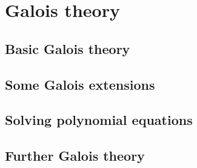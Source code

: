 \part{Galois theory}

\chapter{Basic Galois theory}
    
    
    
    
    
    
\chapter{Some Galois extensions}
    
    
    
    

\chapter{Solving polynomial equations}
    
    
    
    

\chapter{Further Galois theory}
    
    
    
    
